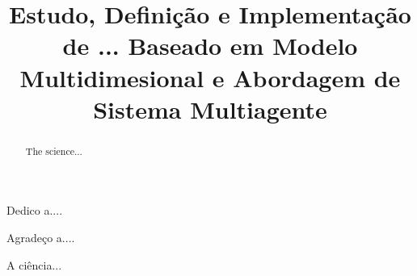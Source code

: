 \documentclass[bacharelado]{unb-cic}
\title{Estudo, Definição e Implementação de ... Baseado em Modelo Multidimesional e Abordagem de Sistema Multiagente}
\begin{document}
  \maketitle
  \pretextual

  \begin{dedicatoria}
  Dedico a....
  \end{dedicatoria}

  \begin{agradecimentos}
  Agradeço a....
  \end{agradecimentos}

  \begin{resumo}
  A ciência...
  \end{resumo}

  \begin{abstract}
  The science...
  \end{abstract}

  \tableofcontents
  \listoffigures
  \listoftables

  \textual
  
  
  
  
  

  \postextual
  
  
\end{document}
